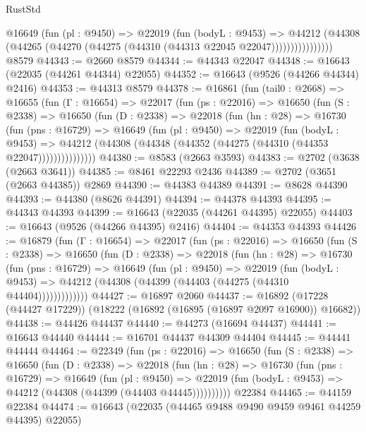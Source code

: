 \begin{lexlean}{RustStd}
\begin{coremodule}
                  @16649
                    (fun (pl : @9450) =>
                    @22019
                      (fun (bodyL : @9453) =>
                      @44212
                        (@44308
                          (@44265 (@44270 (@44275 (@44310 (@44313 @22045 @22047))))))))))))))))
    @8579
@44343 := @2660 @8579
@44344 := @44343 @22047
@44348 := @16643 (@22035 (@44261 @44344) @22055)
@44352 := @16643 (@9526 (@44266 @44344) @2416)
@44353 := @44313 @8579
@44378 := @16861
    (fun (tail0 : @2668) =>
    @16655
      (fun (Γ : @16654) =>
      @22017
        (fun (ps : @22016) =>
        @16650
          (fun (S : @2338) =>
          @16650
            (fun (D : @2338) =>
            @22018
              (fun (hn : @28) =>
              @16730
                (fun (pns : @16729) =>
                @16649
                  (fun (pl : @9450) =>
                  @22019
                    (fun (bodyL : @9453) =>
                    @44212 (@44308 (@44348 (@44352 (@44275 (@44310 (@44353 @22047)))))))))))))))
@44380 := @8583 (@2663 @3593)
@44383 := @2702 (@3638 (@2663 @3641))
@44385 := @8461 @22293 @2436
@44389 := @2702 (@3651 (@2663 @44385)) @2869
@44390 := @44383 @44389
@44391 := @8628 @44390
@44393 := @44380 (@8626 @44391)
@44394 := @44378 @44393
@44395 := @44343 @44393
@44399 := @16643 (@22035 (@44261 @44395) @22055)
@44403 := @16643 (@9526 (@44266 @44395) @2416)
@44404 := @44353 @44393
@44426 := @16879
    (fun (Γ : @16654) =>
    @22017
      (fun (ps : @22016) =>
      @16650
        (fun (S : @2338) =>
        @16650
          (fun (D : @2338) =>
          @22018
            (fun (hn : @28) =>
            @16730
              (fun (pns : @16729) =>
              @16649
                (fun (pl : @9450) =>
                @22019
                  (fun (bodyL : @9453) =>
                  @44212 (@44308 (@44399 (@44403 (@44275 (@44310 @44404)))))))))))))
@44427 := @16897 @2060
@44437 := @16892 (@17228 (@44427 @17229)) (@18222 (@16892 (@16895 (@16897 @2097 @16900)) @16682))
@44438 := @44426 @44437
@44440 := @44273 (@16694 @44437)
@44441 := @16643 @44440
@44444 := @16701 @44437 @44309 @44404
@44445 := @44441 @44444
@44464 := @22349
    (fun (ps : @22016) =>
    @16650
      (fun (S : @2338) =>
      @16650
        (fun (D : @2338) =>
        @22018
          (fun (hn : @28) =>
          @16730
            (fun (pns : @16729) =>
            @16649
              (fun (pl : @9450) =>
              @22019 (fun (bodyL : @9453) => @44212 (@44308 (@44399 (@44403 @44445))))))))))
    @22384
@44465 := @44159 @22384
@44474 := @16643 (@22035 (@44465 @9488 @9490 @9459 @9461 @44259 @44395) @22055)

\end{coremodule}
\end{lexlean}
